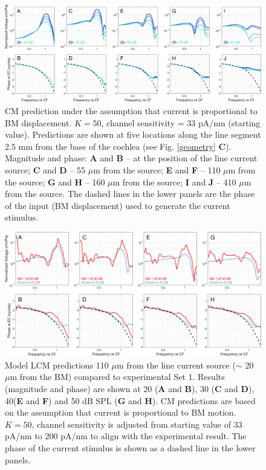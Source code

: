 \documentclass{biophys-new}
\begin{document}
\begin{figure}[h]
\centering
\includegraphics[width = \textwidth]{final_figures/distance.pdf}
\caption{CM prediction under the assumption that current is proportional to BM displacement. $K=50$, channel sensitivity = 33 pA/nm (starting value). Predictions are shown at five locations along the line segment 2.5 mm from the base of the cochlea (see Fig. \ref{geometry} \textbf{C}). Magnitude and phase: \textbf{A} and \textbf{B} -- at the position of the line current source; \textbf{C} and \textbf{D} -- 55 $\mu$m from the source; \textbf{E} and \textbf{F} -- 110 $\mu$m from the source; \textbf{G} and \textbf{H} -- 160 $\mu$m from the source; \textbf{I} and \textbf{J} -- 410 $\mu$m from the source. The dashed lines in the lower panels are the phase of the input (BM displacement) used to generate the current stimulus.}
\label{distance}
\end{figure}

\begin{figure}[h]
\centering
\includegraphics[width = \textwidth]{final_figures/compset110um.pdf}
\caption{Model LCM predictions 110 $\mu$m from the line current source ($\sim$ 20 $\mu$m from the BM) compared to experimental Set 1. Results (magnitude and phase) are shown at 20 (\textbf{A} and \textbf{B}), 30 (\textbf{C} and \textbf{D}), 40(\textbf{E} and \textbf{F}) and 50 dB SPL (\textbf{G} and \textbf{H}). CM predictions are based on the assumption that current is proportional to BM motion.  $K=50$, channel sensitivity is adjusted from starting value of 33 pA/nm to 200 pA/nm to align with the experimental result. The phase of the current stimulus is shown as a dashed line in the lower panels.}
\label{s1}
\end{figure}
\end{document}
